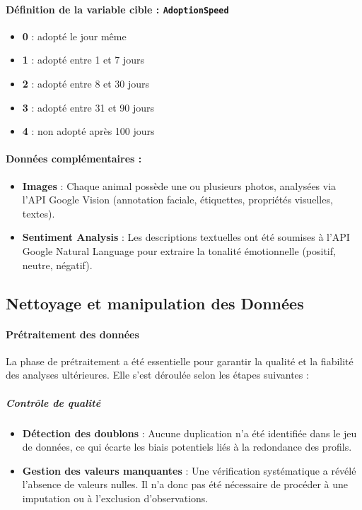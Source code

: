 \documentclass[a4paper,12pt]{article}
\begin{document}
\paragraph{Définition de la variable cible : \texttt{AdoptionSpeed}}
\begin{itemize}
    \item \textbf{0} : adopté le jour même
    \item \textbf{1} : adopté entre 1 et 7 jours
    \item \textbf{2} : adopté entre 8 et 30 jours
    \item \textbf{3} : adopté entre 31 et 90 jours
    \item \textbf{4} : non adopté après 100 jours
\end{itemize}

\paragraph{Données complémentaires :}
\begin{itemize}
    \item \textbf{Images} : Chaque animal possède une ou plusieurs photos, analysées via l'API Google Vision (annotation faciale, étiquettes, propriétés visuelles, textes).
    \item \textbf{Sentiment Analysis} : Les descriptions textuelles ont été soumises à l’API Google Natural Language pour extraire la tonalité émotionnelle (positif, neutre, négatif).
\end{itemize}

\subsection{Nettoyage et manipulation des Données}

\paragraph{Prétraitement des données}

La phase de prétraitement a été essentielle pour garantir la qualité et la fiabilité des analyses ultérieures. Elle s’est déroulée selon les étapes suivantes :

\subparagraph{Contrôle de qualité}
\begin{itemize}
    \item \textbf{Détection des doublons} : Aucune duplication n’a été identifiée dans le jeu de données, ce qui écarte les biais potentiels liés à la redondance des profils.
    \item \textbf{Gestion des valeurs manquantes} : Une vérification systématique a révélé l'absence de valeurs nulles. Il n’a donc pas été nécessaire de procéder à une imputation ou à l’exclusion d’observations.
\end{itemize}
\end{document}
